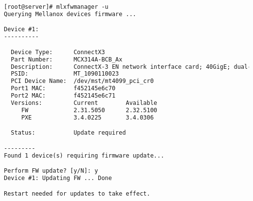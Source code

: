 \begin{lstlisting}[language=TeX,label={lst:setup-firmware-update},caption={Firmware update procedure}]
[root@server]# mlxfwmanager -u
Querying Mellanox devices firmware ...

Device #1:
----------

  Device Type:      ConnectX3
  Part Number:      MCX314A-BCB_Ax
  Description:      ConnectX-3 EN network interface card; 40GigE; dual-port QSFP; PCIe3.0 x8 8GT/s; RoHS R6
  PSID:             MT_1090110023
  PCI Device Name:  /dev/mst/mt4099_pci_cr0
  Port1 MAC:        f452145e6c70
  Port2 MAC:        f452145e6c71
  Versions:         Current        Available     
     FW             2.31.5050      2.32.5100     
     PXE            3.4.0225       3.4.0306      

  Status:           Update required

---------
Found 1 device(s) requiring firmware update...

Perform FW update? [y/N]: y
Device #1: Updating FW ... Done

Restart needed for updates to take effect.
\end{lstlisting}

